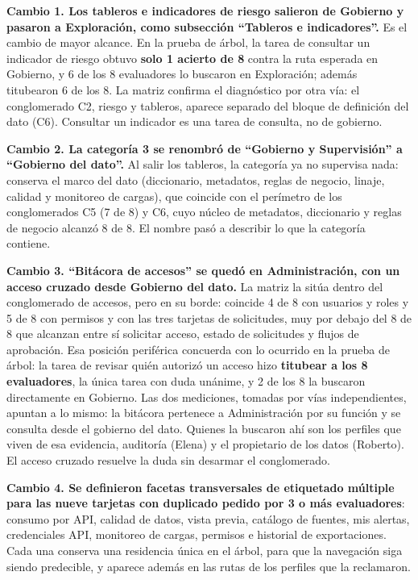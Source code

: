 \begin{uxlist}
  \item \textbf{Cambio 1. Los tableros e indicadores de riesgo salieron de Gobierno y pasaron a Exploración, como subsección ``Tableros e indicadores''.} Es el cambio de mayor alcance. En la prueba de árbol, la tarea de consultar un indicador de riesgo obtuvo \textbf{solo 1 acierto de 8} contra la ruta esperada en Gobierno, y 6 de los 8 evaluadores lo buscaron en Exploración; además titubearon 6 de los 8. La matriz confirma el diagnóstico por otra vía: el conglomerado C2, riesgo y tableros, aparece separado del bloque de definición del dato (C6). Consultar un indicador es una tarea de consulta, no de gobierno.
  \item \textbf{Cambio 2. La categoría 3 se renombró de ``Gobierno y Supervisión'' a ``Gobierno del dato''.} Al salir los tableros, la categoría ya no supervisa nada: conserva el marco del dato (diccionario, metadatos, reglas de negocio, linaje, calidad y monitoreo de cargas), que coincide con el perímetro de los conglomerados C5 (7 de 8) y C6, cuyo núcleo de metadatos, diccionario y reglas de negocio alcanzó 8 de 8. El nombre pasó a describir lo que la categoría contiene.
  \item \textbf{Cambio 3. ``Bitácora de accesos'' se quedó en Administración, con un acceso cruzado desde Gobierno del dato.} La matriz la sitúa dentro del conglomerado de accesos, pero en su borde: coincide 4 de 8 con usuarios y roles y 5 de 8 con permisos y con las tres tarjetas de solicitudes, muy por debajo del 8 de 8 que alcanzan entre sí solicitar acceso, estado de solicitudes y flujos de aprobación. Esa posición periférica concuerda con lo ocurrido en la prueba de árbol: la tarea de revisar quién autorizó un acceso hizo \textbf{titubear a los 8 evaluadores}, la única tarea con duda unánime, y 2 de los 8 la buscaron directamente en Gobierno. Las dos mediciones, tomadas por vías independientes, apuntan a lo mismo: la bitácora pertenece a Administración por su función y se consulta desde el gobierno del dato. Quienes la buscaron ahí son los perfiles que viven de esa evidencia, auditoría (Elena) y el propietario de los datos (Roberto). El acceso cruzado resuelve la duda sin desarmar el conglomerado.
  \item \textbf{Cambio 4. Se definieron facetas transversales de etiquetado múltiple para las nueve tarjetas con duplicado pedido por 3 o más evaluadores}: consumo por API, calidad de datos, vista previa, catálogo de fuentes, mis alertas, credenciales API, monitoreo de cargas, permisos e historial de exportaciones. Cada una conserva una residencia única en el árbol, para que la navegación siga siendo predecible, y aparece además en las rutas de los perfiles que la reclamaron.
\end{uxlist}

